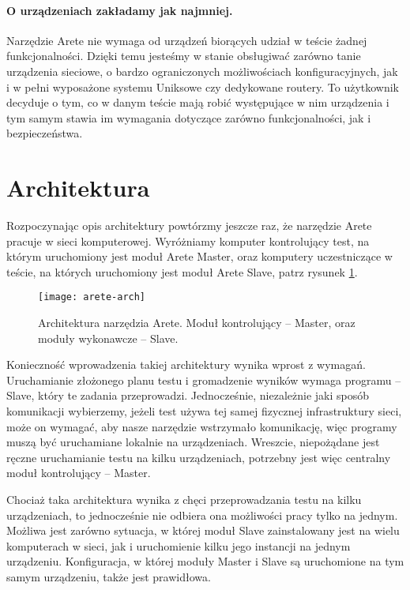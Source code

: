 \documentclass[00-praca-magisterska.tex]{subfiles}
\begin{document}
\paragraph{O urządzeniach zakładamy jak najmniej.} Narzędzie Arete nie
wymaga od urządzeń biorących udział w teście żadnej funkcjonalności.
Dzięki temu jesteśmy w stanie obsługiwać zarówno tanie urządzenia sieciowe, o
bardzo ograniczonych możliwościach konfiguracyjnych, jak i w pełni wyposażone
systemu Uniksowe czy dedykowane routery. To użytkownik decyduje o tym, co w
danym teście mają robić występujące w nim urządzenia i tym samym stawia
im wymagania dotyczące zarówno funkcjonalności, jak i bezpieczeństwa.

\section{Architektura}
\label{arete-arch}

Rozpoczynając opis architektury powtórzmy jeszcze raz, że narzędzie Arete
pracuje w sieci komputerowej. Wyróżniamy komputer kontrolujący test, na którym
uruchomiony jest moduł Arete Master, oraz komputery uczestniczące w teście, na
których uruchomiony jest moduł Arete Slave, patrz rysunek \ref{fig:arete-arch}.

\begin{figure}
\begin{center}
\leavevmode
\texttt{[image: arete-arch]}
\end{center}
\caption{Architektura narzędzia Arete. Moduł kontrolujący -- Master, oraz
moduły wykonawcze -- Slave.}
\label{fig:arete-arch}
\end{figure}

Konieczność wprowadzenia takiej architektury wynika wprost z wymagań.
Uruchamianie złożonego planu testu i gromadzenie wyników wymaga programu --
Slave, który te zadania przeprowadzi. Jednocześnie, niezależnie jaki sposób
komunikacji wybierzemy, jeżeli test używa tej samej fizycznej infrastruktury
sieci, może on wymagać, aby nasze narzędzie wstrzymało komunikację, więc
programy muszą być uruchamiane lokalnie na urządzeniach. Wreszcie,
niepożądane jest ręczne uruchamianie testu na kilku urządzeniach, potrzebny
jest więc centralny moduł kontrolujący -- Master.

Chociaż taka architektura wynika z chęci przeprowadzania testu na kilku
urządzeniach, to jednocześnie nie odbiera ona możliwości pracy tylko na jednym.
Możliwa jest zarówno sytuacja, w której moduł Slave zainstalowany jest na
wielu komputerach w sieci, jak i uruchomienie kilku jego instancji na
jednym urządzeniu. Konfiguracja, w której moduły Master i Slave są uruchomione
na tym samym urządzeniu, także jest prawidłowa.
\end{document}
